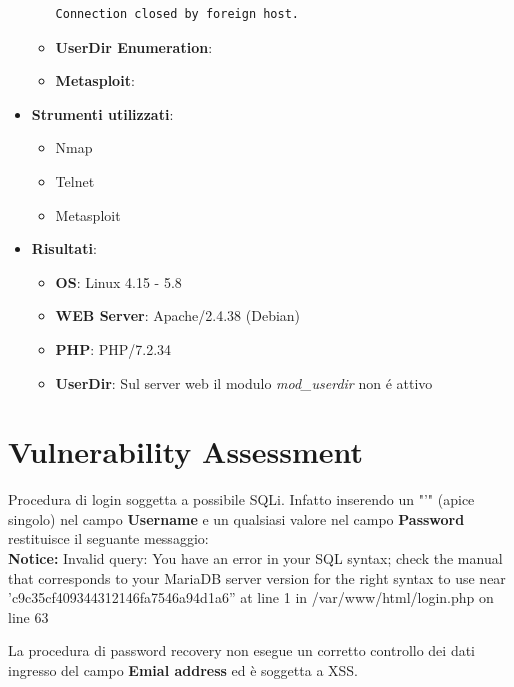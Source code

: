 \documentclass[12pt]{article}
\begin{document}
\begin{itemize}
\begin{itemize}
\begin{lstlisting}[label=shell, basicstyle=\tiny]
Connection closed by foreign host.                
            \end{lstlisting}
            \item \textbf{UserDir Enumeration}:
            \item \textbf{Metasploit}:   
        \end{itemize}

        \item \textbf{Strumenti utilizzati}:
        \begin{itemize}
            \item Nmap
            \item Telnet
            \item Metasploit
        \end{itemize}
        \item \textbf{Risultati}:
        \begin{itemize}
            \item \textbf{OS}: Linux 4.15 - 5.8
            \item \textbf{WEB Server}: Apache/2.4.38 (Debian)
            \item \textbf{PHP}: PHP/7.2.34
            \item \textbf{UserDir}: Sul server web il modulo \textit{mod\_userdir} non \'{e} attivo
        \end{itemize}
    \end{itemize}

\section{Vulnerability Assessment}

Procedura di login soggetta a possibile SQLi. Infatto inserendo un "'" (apice singolo)
nel campo \textbf{Username} e un qualsiasi valore nel campo \textbf{Password} restituisce 
il seguante messaggio: \\
\textbf{Notice:} Invalid query: You have an error in your SQL syntax; check the manual that 
corresponds to your MariaDB server version for the right syntax to use near 
'c9c35cf409344312146fa7546a94d1a6'' at line 1 in /var/www/html/login.php on line 63

La procedura di password recovery non esegue un corretto controllo dei dati ingresso 
del campo \textbf{Emial address} ed \`{e} soggetta a XSS.
\end{document}
